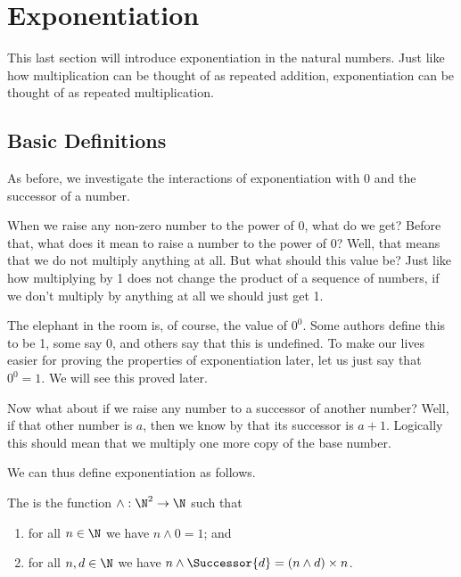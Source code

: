 \section{Exponentiation}
This last section will introduce exponentiation in the natural numbers. Just like how multiplication can be thought of as repeated addition, exponentiation can be thought of as repeated multiplication.

\subsection{Basic Definitions}
As before, we investigate the interactions of exponentiation with 0 and the successor of a number.

When we raise any non-zero number to the power of 0, what do we get? Before that, what does it mean to raise a number to the power of 0? Well, that means that we do not multiply anything at all. But what should this value be? Just like how multiplying by 1 does not change the product of a sequence of numbers, if we don't multiply by anything at all we should just get 1.

\begin{remark}[$0^0$]
    The elephant in the room is, of course, the value of $0^0$. Some authors define this to be 1, some say 0, and others say that this is undefined. To make our lives easier for proving the properties of exponentiation later, let us just say that $0^0 = 1$. We will see this proved later.
\end{remark}

Now what about if we raise any number to a successor of another number? Well, if that other number is $a$, then we know by  that its successor is $a+1$. Logically this should mean that we multiply one more copy of the base number.

We can thus define exponentiation as follows.

\begin{definition}[Exponentiation]
    The  is the function $\wedge: \N^2 \to \N$ such that
    \begin{enumerate}[label=\textbf{E\arabic*.}]
        \item for all $n \in \N$ we have $n \wedge 0 = 1$; and
        \item for all $n, d \in \N$ we have $n \wedge \Successor{d} = (n \wedge d) \times n$.
    \end{enumerate}
\end{definition}

